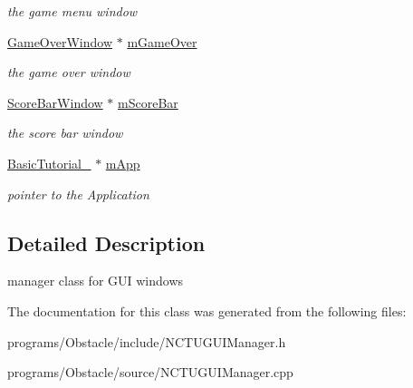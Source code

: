 \begin{DoxyCompactItemize}
\begin{DoxyCompactList}\small\item\em the game menu window \end{DoxyCompactList}\item 
\hyperlink{class_n_c_t_u_1_1_game_over_window}{Game\+Over\+Window} $\ast$ \hyperlink{class_n_c_t_u_1_1_g_u_i_manager_a68d462d40647f785234e7d77d4c8229d}{m\+Game\+Over}\hypertarget{class_n_c_t_u_1_1_g_u_i_manager_a68d462d40647f785234e7d77d4c8229d}{}\label{class_n_c_t_u_1_1_g_u_i_manager_a68d462d40647f785234e7d77d4c8229d}

\begin{DoxyCompactList}\small\item\em the game over window \end{DoxyCompactList}\item 
\hyperlink{class_n_c_t_u_1_1_score_bar_window}{Score\+Bar\+Window} $\ast$ \hyperlink{class_n_c_t_u_1_1_g_u_i_manager_aea42b1af9d6b26dab0c8969d5718a63d}{m\+Score\+Bar}\hypertarget{class_n_c_t_u_1_1_g_u_i_manager_aea42b1af9d6b26dab0c8969d5718a63d}{}\label{class_n_c_t_u_1_1_g_u_i_manager_aea42b1af9d6b26dab0c8969d5718a63d}

\begin{DoxyCompactList}\small\item\em the score bar window \end{DoxyCompactList}\item 
\hyperlink{class_basic_tutorial__00}{Basic\+Tutorial\+\_} $\ast$ \hyperlink{class_n_c_t_u_1_1_g_u_i_manager_a8271d8105e254bda58752cf35a4d28fa}{m\+App}\hypertarget{class_n_c_t_u_1_1_g_u_i_manager_a8271d8105e254bda58752cf35a4d28fa}{}\label{class_n_c_t_u_1_1_g_u_i_manager_a8271d8105e254bda58752cf35a4d28fa}

\begin{DoxyCompactList}\small\item\em pointer to the Application \end{DoxyCompactList}\end{DoxyCompactItemize}


\subsection{Detailed Description}
manager class for G\+UI windows 

The documentation for this class was generated from the following files\+:\begin{DoxyCompactItemize}
\item 
programs/\+Obstacle/include/N\+C\+T\+U\+G\+U\+I\+Manager.\+h\item 
programs/\+Obstacle/source/N\+C\+T\+U\+G\+U\+I\+Manager.\+cpp\end{DoxyCompactItemize}
